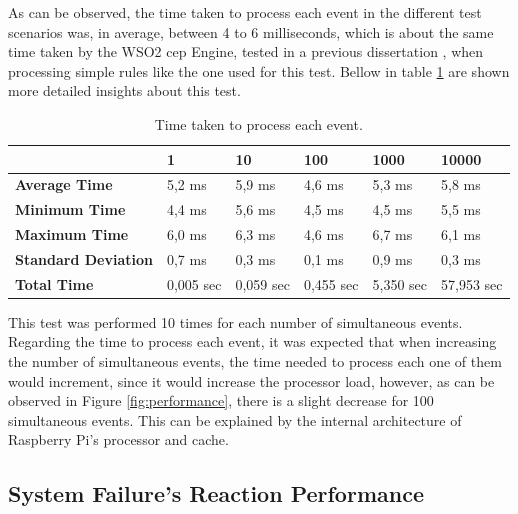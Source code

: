 As can be observed, the time taken to process each event in the different test scenarios was, in average, between 4 to 6 milliseconds, which is about the same time taken by the WSO2 \ac{cep} Engine, tested in a previous dissertation \cite{helder}, when processing simple rules like the one used for this test. Bellow in table \ref{table:event} are shown more detailed insights about this test.

\begin{table}[H]
	\begin{tabular}{l|l|l|l|l|l|}
		\cline{2-6}
		& \textbf{1} & \textbf{10} & \textbf{100} & \textbf{1000} & \textbf{10000} \\ \hline
		\multicolumn{1}{|l|}{\textbf{Average Time}}       & 5,2 ms     & 5,9 ms      & 4,6 ms       & 5,3 ms        & 5,8 ms         \\ \hline
		\multicolumn{1}{|l|}{\textbf{Minimum Time}}       & 4,4 ms     & 5,6 ms      & 4,5 ms       & 4,5 ms        & 5,5 ms         \\ \hline
		\multicolumn{1}{|l|}{\textbf{Maximum Time}}       & 6,0 ms     & 6,3 ms      & 4,6 ms       & 6,7 ms        & 6,1 ms         \\ \hline
		\multicolumn{1}{|l|}{\textbf{Standard Deviation}} & 0,7 ms     & 0,3 ms      & 0,1 ms         & 0,9 ms        & 0,3 ms         \\ \hline
		\multicolumn{1}{|l|}{\textbf{Total Time}}         & 0,005 sec  & 0,059 sec   & 0,455 sec    & 5,350 sec     & 57,953 sec     \\ \hline
	\end{tabular}
	\centering
\caption{Time taken to process each event.}
\label{table:event}
\end{table}

This test was performed 10 times for each number of simultaneous events. Regarding the time to process each event, it was expected that when increasing the number of simultaneous events, the time needed to process each one of them would increment, since it would increase the processor load, however, as can be observed in Figure \ref{fig:performance}, there is a slight decrease for 100 simultaneous events. This can be explained by the internal architecture of Raspberry Pi's processor and cache.

\subsection{System Failure's Reaction Performance}
\label{results:fail}

